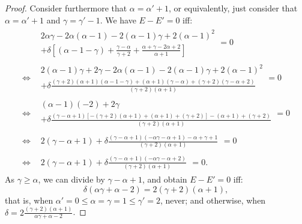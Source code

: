 \documentclass[version=3.21, pagesize, twoside=off, bibliography=totoc, DIV=calc, fontsize=12pt, a4paper]{scrartcl}
\begin{document}
\begin{proof}
	Consider furthermore that $\alpha = \alpha' + 1$, or equivalently, just consider that $\alpha = \alpha' + 1$ and $\gamma = \gamma' - 1$. 
	We have $E - E' = 0$ iff:
	\begin{align}
		& \begin{split}
		2 \alpha \gamma - 2 \alpha (\alpha - 1) - 2 (\alpha - 1) \gamma + 2 (\alpha - 1)^2\\
			+ \delta [(\alpha - 1 - \gamma) + \frac{\gamma - \alpha}{\gamma + 2} + \frac{\alpha + \gamma - 2 \alpha + 2}{\alpha + 1}]
		\end{split} = 0\\
		⇔ & \begin{split}
		2 (\alpha - 1) \gamma + 2 \gamma - 2 \alpha (\alpha - 1) - 2 (\alpha - 1) \gamma + 2 (\alpha - 1)^2\\
			+ \delta \frac{(\gamma + 2) (\alpha + 1) (\alpha - 1 - \gamma) + (\alpha + 1) (\gamma - \alpha) + (\gamma + 2) (\gamma - \alpha + 2)}{(\gamma + 2) (\alpha + 1)}
		\end{split} = 0\\
		⇔ & \begin{split}
		(\alpha - 1) (- 2) + 2 \gamma\\
			+ \delta \frac{(\gamma - \alpha + 1) [- (\gamma + 2) (\alpha + 1) + (\alpha + 1) + (\gamma + 2)] - (\alpha + 1) + (\gamma + 2)}{(\gamma + 2) (\alpha + 1)}
		\end{split} = 0\\
		⇔ & \begin{split}
		2 (\gamma - \alpha + 1)
			+ \delta \frac{(\gamma - \alpha + 1) (- \alpha \gamma - \alpha + 1) - \alpha + \gamma + 1}{(\gamma + 2) (\alpha + 1)}
		\end{split} = 0\\
		⇔ & \begin{split}
		2 (\gamma - \alpha + 1)
			+ \delta \frac{(\gamma - \alpha + 1) (- \alpha \gamma - \alpha + 2)}{(\gamma + 2) (\alpha + 1)}
		\end{split} = 0.
	\end{align}
	As $\gamma ≥ \alpha$, we can divide by $\gamma - \alpha + 1$, and obtain $E - E' = 0$ iff:
	\begin{equation}
		\delta (\alpha \gamma + \alpha - 2) = 2 (\gamma + 2) (\alpha + 1),
	\end{equation}
	that is, when $\alpha' = 0 ≤ \alpha = \gamma = 1 ≤ \gamma' = 2$, never; and otherwise, when $\delta = 2 \frac{(\gamma + 2) (\alpha + 1)}{\alpha \gamma + \alpha - 2}$.
\end{proof}
	
\end{document}
